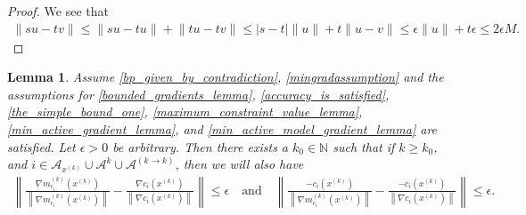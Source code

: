\documentclass{article}
\newtheorem{lemma}[theorem]{Lemma}
\theoremstyle{case}
\numberwithin{theorem}{subsection}
\newcommand{\gmcik}{{\nabla m_{c_i}^{(k)}\left(\xk\right)}}
\newcommand{\naturals}{\mathbb N}
\newcommand{\xk}{x^{(k)}}
\begin{document}
\begin{proof}
We see that
\begin{align}
\bigg\|su - tv\bigg\| \le \bigg\|su - tu\bigg\| + \bigg\|tu- tv\bigg\| \le |s - t| \|u\| + t \|u - v\| \le \epsilon \|u\| + t \epsilon \le 2 \epsilon M.
\end{align}
\end{proof}


\begin{lemma}
\label{bp_models_are_close_to_true_values}
Assume \cref{bp_given_by_contradiction}, \cref{mingradassumption} and the assumptions for
\cref{bounded_gradients_lemma},
\cref{accuracy_is_satisfied},
\cref{the_simple_bound_one},
\cref{maximum_constraint_value_lemma},
\cref{min_active_gradient_lemma},
and \cref{min_active_model_gradient_lemma}
are satisfied.
Let $\epsilon > 0$ be arbitrary.
Then there exists a $k_0 \in \naturals$ such that if $k \ge k_0$, and $i \in \mathcal A_{\xk} \cup \mathcal A^{k} \cup \mathcal A^{(k \to k)} $,
then we will also have%
\begin{align*}
\left\|\frac{\gmcik}{\left\|\gmcik\right\|} - \frac{\nabla c_i\left(\xk\right)}{\left\|\nabla c_i\left(\xk \right)\right\|} \right\| \le \epsilon \quad \textrm{and} \quad
\left\|\frac{-c_i\left(\xk \right)}{\left\|\gmcik\right\|} - \frac{-c_i\left(\xk \right)}{\left\|\nabla c_i\left(\xk \right)\right\|} \right\| \le \epsilon.
\end{align*}
\end{lemma}
\end{document}
